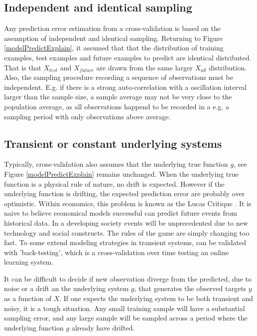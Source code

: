 \subsection{Independent and identical sampling}
Any prediction error estimation from a cross-validation is based on the assumption of independent and identical sampling. Returning to Figure \ref{modelPredictExplain}, it assumed that that the distribution of training examples, test examples and future examples to predict are identical distributed. That is that $X_{test}$ and $X_{future}$ are drawn from the same larger $X_{all}$ distribution. Also, the sampling procedure recording a sequence of observations must be independent. E.g. if there is a strong auto-correlation with a oscillation interval larger than the sample size, a sample average may not be very close to the population average, as all observations happend to be recorded in a e.g. a sampling period with only observations above average.

\subsection{Transient or constant underlying systems}
Typically, cross-validation also assumes that the underlying true function $g$, see Figure \ref{modelPredictExplain} remains unchanged. When the underlying true function is a physical rule of nature, no drift is expected. However if the underlying function is drifting, the expected prediction error are probably over optimistic. Within economics, this problem is known as the Lucas Critique \cite{wiki:Lucus}. It is naive to believe economical models successful can predict future events from historical data. In a developing society events will be unprecedented due to new technology and social constructs. The rules of the game are simply changing too fast. To some extend modeling strategies in transient systems, can be validated with 'back-testing', which is a cross-validation over time testing an online learning system.

It can be difficult to decide if new observation diverge from the predicted, due to noise or  a drift an the underlying system $g$, that generates the observed targets $y$ as a function of $X$. If one expects the underlying system to be both transient and noisy, it is a tough situation. Any small training sample will have a substantial sampling error, and any large sample will be sampled across a period where the underlying function $g$ already have drifted.

